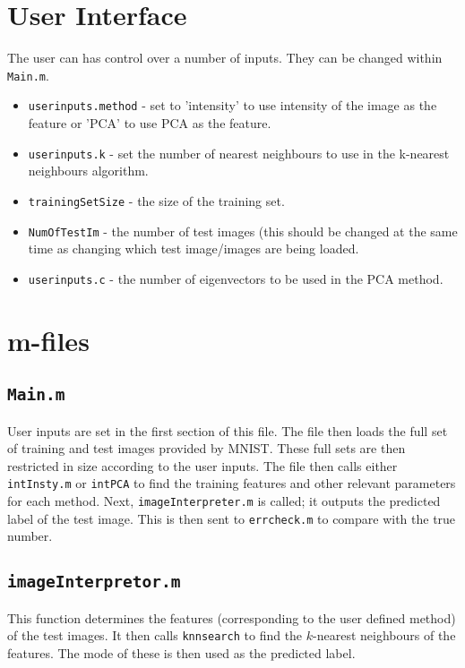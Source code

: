 \documentclass[10pt]{article}
\begin{document}
\section{User Interface}\label{User}
The user can has control over a number of inputs. They can be changed within {\tt Main.m}.  
\begin{itemize}
\setlength\itemsep{0 cm}
\item {\tt userinputs.method} - set to 'intensity' to use intensity of the image as the feature or 'PCA' to use PCA as the feature. 
\item {\tt userinputs.k} - set the number of nearest neighbours to use in the k-nearest neighbours algorithm.  
\item {\tt trainingSetSize} - the size of the training set.
\item {\tt NumOfTestIm} - the number of test images (this should be changed at the same time as changing which test image/images are being loaded.
\item {\tt userinputs.c} - the number of eigenvectors to be used in the PCA method. 
\end{itemize}

\section{m-files} 

\subsection{\tt Main.m} 
User inputs are set in the first section of this file. The file then loads the full set of training and test images provided by MNIST. These full sets are then restricted in size according to the user inputs. The file then calls either {\tt intInsty.m} or {\tt intPCA} to find the training features and other relevant parameters for each method. Next, {\tt imageInterpreter.m} is called; it outputs the predicted label of the test image. This is then sent to {\tt errcheck.m} to compare with the true number.  


\subsection{\tt imageInterpretor.m} 
This function determines the features (corresponding to the user defined method) of the test images. It then calls {\tt knnsearch} to find the $k$-nearest neighbours of the features. The mode of these is then used as the predicted label. \\ 
\end{document}
